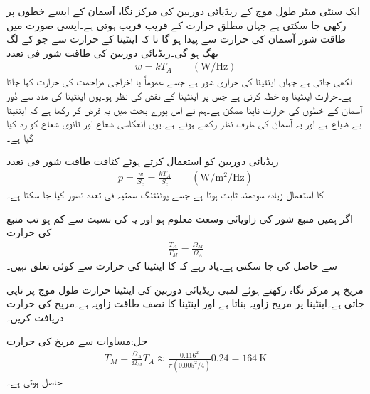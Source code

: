 ایک سنٹی میٹر طول موج کے ریڈیائی دوربین کی مرکز نگاہ  آسمان کے ایسے خطوں پر رکھی جا سکتی ہے جہاں مطلق حرارت  کے قریب قریب ہوتی ہے۔ایسی صورت میں طاقت شور آسمان کی حرارت سے پیدا ہو گا نا کہ اینٹینا کے حرارت سے جو  کے لگ بھگ  ہو گی۔ریڈیائی دوربین کی طاقت شور فی تعدد
\begin{align}
w=k T_A  \quad \quad (\si{\watt \per \hertz})
\end{align}
لکھی جاتی ہے جہاں  اینٹینا کی حراری شور ہے جسے عموماً  یا اخراجی مزاحمت کی حرارت کہا جاتا ہے۔حرارت اینٹینا وہ خطہ کرتی ہے جس پر اینٹینا کے نقش کی نظر ہو۔یوں اینٹینا کی مدد سے دُور آسمان  کے خطوں کی حرارت ناپنا ممکن ہے۔ہم نے اس پورے بحث میں یہ فرض کر رکھا ہے کہ اینٹینا بے ضیاع ہے اور یہ آسمان کی طرف نظر رکھے ہوئے ہے۔یوں انعکاسی شعاع اور ثانوی شعاع کو رد کیا گیا ہے۔

ریڈیائی دوربین کو استعمال کرتے ہوئے  کثافت طاقت شور فی تعدد
\begin{align}
p=\frac{w}{S_e}=\frac{k T_A}{S_e} \quad \quad (\si{\watt \per \meter \squared \per\hertz})
\end{align} 
کا استعمال زیادہ سودمند ثابت ہوتا ہے جسے پوئنٹنگ سمتیہ فی تعدد تصور کیا جا سکتا ہے۔ 

اگر ہمیں منبع شور کی زاویائی وسعت  معلوم ہو اور یہ  کی نسبت سے کم ہو تب منبع کی حرارت
\begin{align}\label{مساوات_اینٹینا_ریڈیائی_حرارت}
\frac{T_A}{T_M}=\frac{\Omega_M}{\Omega_A}
\end{align}
سے حاصل کی جا سکتی ہے۔یاد رہے کہ  کا اینٹینا کی حرارت سے کوئی تعلق نہیں۔

مریخ پر مرکز نگاہ رکھتے ہوئے  لمبی ریڈیائی دوربین کی اینٹینا حرارت  طول موج پر  ناپی جاتی ہے۔اینٹینا پر مریخ  زاویہ بناتا ہے اور اینٹینا کا نصف طاقت زاویہ  ہے۔مریخ کی حرارت دریافت کریں۔

حل:مساوات  سے مریخ کی حرارت
\begin{align*}
T_M=\frac{\Omega_A}{\Omega_M}T_A \approx \frac{0.116^2}{\pi (0.005^2\!/\!4)} 0.24=\SI{164}{\kelvin}
\end{align*}
حاصل ہوتی ہے۔

